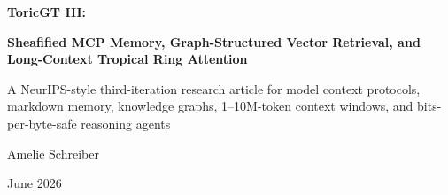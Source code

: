\documentclass[11pt]{article}
\numberwithin{equation}{section}
\begin{document}
\begin{titlepage}
\centering
{\Huge\bfseries ToricGT III:\par}
\vspace{4pt}
{\Huge\bfseries Sheafified MCP Memory, Graph-Structured Vector Retrieval, and Long-Context Tropical Ring Attention\par}
\vspace{10pt}
{\Large A NeurIPS-style third-iteration research article for model context protocols, markdown memory, knowledge graphs, 1--10M-token context windows, and bits-per-byte-safe reasoning agents\par}
\vspace{18pt}
{\large Amelie Schreiber}\par
{\large June 2026}\par
\vfill
\begin{abstract}
ToricGT I made toric geometry operational for graph-token reasoning by attaching finite BGG, Koszul, Gale-dual, and toric-chart certificates to hidden trajectories. ToricGT II replaced isolated certificates by a dynamical theory: a reasoning step became a standardized packet whose filtered simplicial complexes, multigraded persistence modules, sheaves, vector bundles, derived objects, and toric chart codes evolve under a learned graph-to-graph map. This paper develops ToricGT III. The object of study is no longer only a reasoning trajectory inside the model, but the external context substrate through which modern agents operate: model context protocols (MCPs), markdown-style memory, tool/resource/prompt traces, and knowledge graphs vectorized into embeddings with adjacency and provenance.


\end{abstract}
\end{titlepage}
\end{document}
